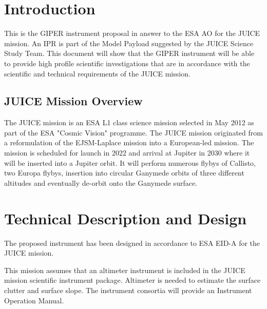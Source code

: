 \section{Introduction}
\label{sec:introduction}
%
This is the \ac{GIPER} instrument proposal in answer to the \ac{ESA} \ac{AO}\cite{JUICE_AO} for the \ac{JUICE} mission. An \ac{IPR} is part of the Model Payload suggested by the  JUICE Science Study Team\cite{yellowbook}. This document will show that the \ac{GIPER} instrument will be able to provide high profile scientific investigations that are in accordance with the scientific and technical requirements of the \ac{JUICE} mission.
%
\subsection{JUICE Mission Overview}
The \ac{JUICE} mission is an \ac{ESA} L1 class science mission selected in May 2012 as part of the \ac{ESA} "Cosmic Vision" programme. The \ac{JUICE} mission originated from a reformulation of the EJSM-Laplace mission into a European-led mission. The mission is scheduled for launch in 2022 and arrival at Jupiter in 2030 where it will be inserted into a Jupiter orbit. It will perform numerous flybys of Callisto, two Europa flybys, insertion into circular Ganymede orbits of three different altitudes and eventually de-orbit onto the Ganymede surface. 
%
%
%

%
\section{Technical Description and Design}
%
The proposed instrument has been designed in accordance to ESA \ac{EID-A} for the \ac{JUICE} mission\cite{EIDA}.
%
%

%
%
This mission assumes that an altimeter instrument is included in the JUICE mission scientific instrument package. Altimeter is needed to estimate the surface clutter and surface slope.
%
The instrument consortia will provide an Instrument Operation Manual.
%
